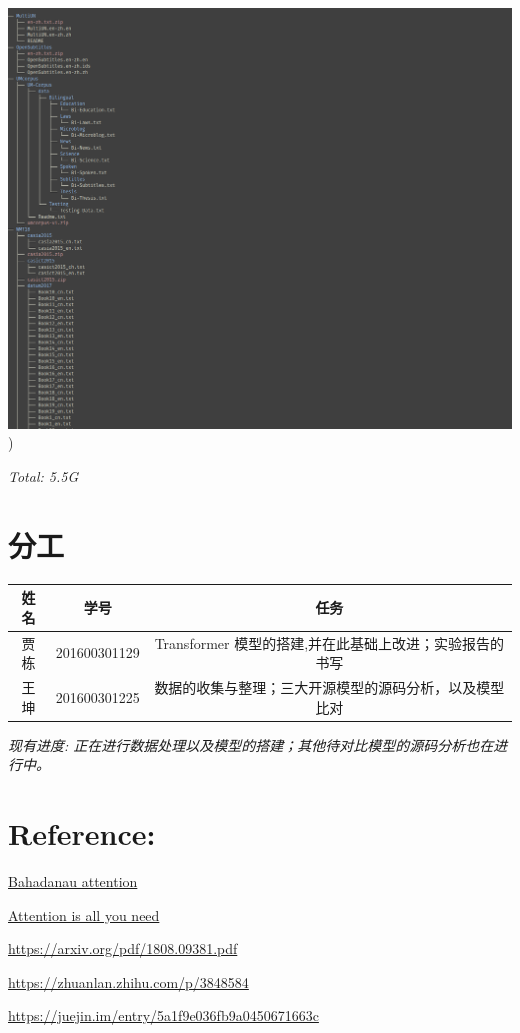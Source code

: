 \documentclass[UTF8,a4paper,10pt]{ctexart}
\begin{document}
\centerline{\includegraphics[scale=0.5]{pics/corpus.png})}
\textit{Total: 5.5G}

\section{分工}
\begin{tabular}{ccc}
\hline
姓名& 学号& 任务\\
\hline
贾栋&201600301129 &Transformer 模型的搭建,并在此基础上改进；实验报告的书写\\
王坤&201600301225 &数据的收集与整理；三大开源模型的源码分析，以及模型比对\\
\hline
\end{tabular}

\textit{现有进度: 正在进行数据处理以及模型的搭建；其他待对比模型的源码分析也在进行中。}

\section{Reference:}

\href{https://arxiv.org/pdf/1409.0473.pdf}{\color{blue}Bahadanau attention}

\href{https://arxiv.org/pdf/1706.03762.pdf}{\color{blue}Attention is all you need}

\href{https://arxiv.org/pdf/1808.09381.pdf}{\color{blue}https://arxiv.org/pdf/1808.09381.pdf}

\href{https://zhuanlan.zhihu.com/p/38485843}{\color{blue}https://zhuanlan.zhihu.com/p/3848584}

\href{https://juejin.im/entry/5a1f9e036fb9a0450671663c}{\color{blue}https://juejin.im/entry/5a1f9e036fb9a0450671663c}

 


\end{document}
